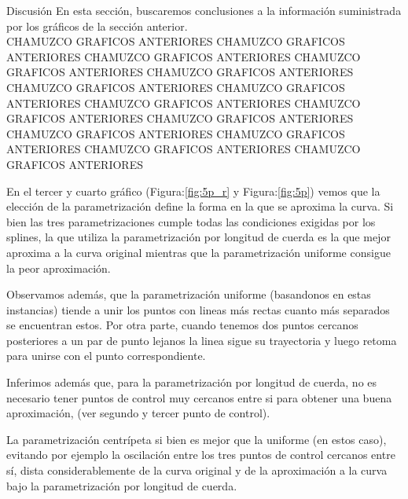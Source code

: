 \begin{section}{Discusión}
	En esta sección, buscaremos conclusiones a la información suministrada por los gráficos de la sección anterior.\\
	
	CHAMUZCO GRAFICOS ANTERIORES	CHAMUZCO GRAFICOS ANTERIORES	CHAMUZCO GRAFICOS ANTERIORES	CHAMUZCO GRAFICOS ANTERIORES	CHAMUZCO GRAFICOS ANTERIORES	CHAMUZCO GRAFICOS ANTERIORES	CHAMUZCO GRAFICOS ANTERIORES	CHAMUZCO GRAFICOS ANTERIORES	CHAMUZCO GRAFICOS ANTERIORES	CHAMUZCO GRAFICOS ANTERIORES	CHAMUZCO GRAFICOS ANTERIORES	CHAMUZCO GRAFICOS ANTERIORES	CHAMUZCO GRAFICOS ANTERIORES	CHAMUZCO GRAFICOS ANTERIORES
	
	En el tercer y cuarto gráfico (Figura:\ref{fig:5p_r} y Figura:\ref{fig:5p}) vemos que la elección de la parametrización define la forma en la que se aproxima la curva. Si bien las tres parametrizaciones cumple todas las condiciones exigidas por los splines, la que utiliza la parametrización por longitud de cuerda es la que mejor aproxima a la curva original mientras que la parametrización uniforme consigue la peor aproximación.
	
	Observamos además, que la parametrización uniforme (basandonos en estas instancias) tiende a unir los puntos con lineas más rectas cuanto más separados se encuentran estos. Por otra parte, cuando tenemos dos puntos cercanos posteriores a un par de punto lejanos la linea sigue su trayectoria y luego retoma para unirse con el punto correspondiente.  
	
	
	
	Inferimos además que, para la parametrización por longitud de cuerda, no es necesario tener puntos de control muy cercanos entre si para obtener una buena aproximación, (ver segundo y tercer punto de control).
	
	La parametrización centrípeta si bien es mejor que la uniforme (en estos caso), evitando por ejemplo la oscilación entre los tres puntos de control cercanos entre sí, dista considerablemente de la curva original y de la aproximación a la curva bajo la parametrización por longitud de cuerda.\\
	

\end{section}
